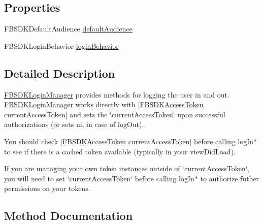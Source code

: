 \subsection*{Properties}
\begin{DoxyCompactItemize}
\item 
F\+B\+S\+D\+K\+Default\+Audience \hyperlink{interface_f_b_s_d_k_login_manager_a4f662c89be174bb577acf75f95aefbc0}{default\+Audience}
\item 
F\+B\+S\+D\+K\+Login\+Behavior \hyperlink{interface_f_b_s_d_k_login_manager_a6380b50840262848d8fd3e224de9f520}{login\+Behavior}
\end{DoxyCompactItemize}


\subsection{Detailed Description}
{\ttfamily \hyperlink{interface_f_b_s_d_k_login_manager}{F\+B\+S\+D\+K\+Login\+Manager}} provides methods for logging the user in and out.  {\ttfamily \hyperlink{interface_f_b_s_d_k_login_manager}{F\+B\+S\+D\+K\+Login\+Manager}} works directly with {\ttfamily \mbox{[}\hyperlink{interface_f_b_s_d_k_access_token}{F\+B\+S\+D\+K\+Access\+Token} current\+Access\+Token\mbox{]}} and sets the \char`\"{}current\+Access\+Token\char`\"{} upon successful authorizations (or sets {\ttfamily nil} in case of {\ttfamily log\+Out}).

You should check {\ttfamily \mbox{[}\hyperlink{interface_f_b_s_d_k_access_token}{F\+B\+S\+D\+K\+Access\+Token} current\+Access\+Token\mbox{]}} before calling log\+In$\ast$ to see if there is a cached token available (typically in your view\+Did\+Load).

If you are managing your own token instances outside of \char`\"{}current\+Access\+Token\char`\"{}, you will need to set \char`\"{}current\+Access\+Token\char`\"{} before calling log\+In$\ast$ to authorize futher permissions on your tokens. 

\subsection{Method Documentation}
\hypertarget{interface_f_b_s_d_k_login_manager_a976326a3af4e52782f1e23a050321636}{}
